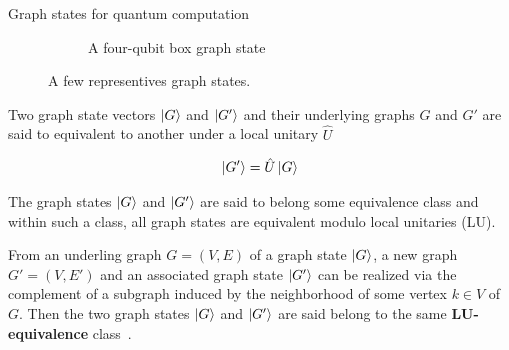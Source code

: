 \documentclass[final]{beamer}
\newlength{\colwidth}
\begin{document}
\begin{frame}[t]
\begin{columns}[t]
\begin{column}{\colwidth}
\begin{block}{Graph states for quantum computation}
\begin{figure}[H]
\begin{subfigure}[b]{0.40\textwidth}
                            \label{fig:linear_cluster_4q}
                        \end{subfigure}
                        \begin{subfigure}[b]{0.40\textwidth}
                            \centering
                            \caption{A four-qubit box graph state}
                            \label{fig:box_cluster_4q}
                        \end{subfigure}
                        \caption{A few representives graph states. }
                        \label{fig:graph_states}
                    \end{figure}

                    Two graph state vectors $\ket{G}$ and $\ket{G'}$  and their
                    underlying graphs $G$ and  $G'$ are said to
                    equivalent to another under a local unitary $\hat{U}$ 

                    \begin{align}
                        \ket{G'} = \hat{U}\ket{G}
                        \label{eq:graph_state_unitary_equivalence}
                    \end{align}

                    The graph states $\ket{G}$ and  $\ket{G'}$ are said to belong some
                    equivalence class and within such a class, all graph states are
                    equivalent modulo local unitaries (LU). 


                    From an underling graph $G = (V, E)$ of a graph state $\ket{G}$, a new
                    graph $G' = (V, E')$ and an associated graph state $\ket{G'}$ can be
                    realized via the complement of a subgraph induced by the neighborhood of some vertex $k
                    \in V$ of $G$. Then the two graph states $\ket{G}$ and $\ket{G'}$ are said belong to the same
                    \textbf{LU-equivalence} class~\cite{PhysRevA.69.062311}.
                \end{block}
            \end{column}


\end{columns}
\end{frame}
\end{document}
